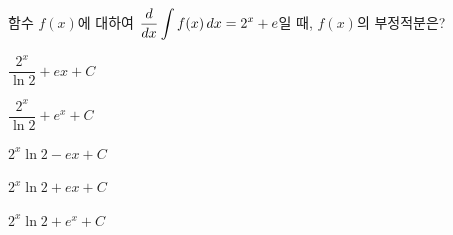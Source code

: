 함수 $f(x)$에 대하여 $\dfrac{d}{dx}\displaystyle\int f(x)\mkern3mu dx=2^x+e$일 때, $f(x)$의 부정적분은? 
\begin{choicesii}{\rule[-3ex]{0pt}{8ex}$\dfrac{2^x}{\ln 2}+ex+C$}{\rule[-3ex]{0pt}{8ex}$\dfrac{2^x}{\ln 2}+e^x+C$}{\rule[-3ex]{0pt}{8ex}$2^x\ln 2-ex+C$}{\rule[-3ex]{0pt}{8ex}$2^x\ln 2+ex+C$}{\rule[-3ex]{0pt}{8ex}$2^x\ln 2+e^x+C$}\end{choicesii}
